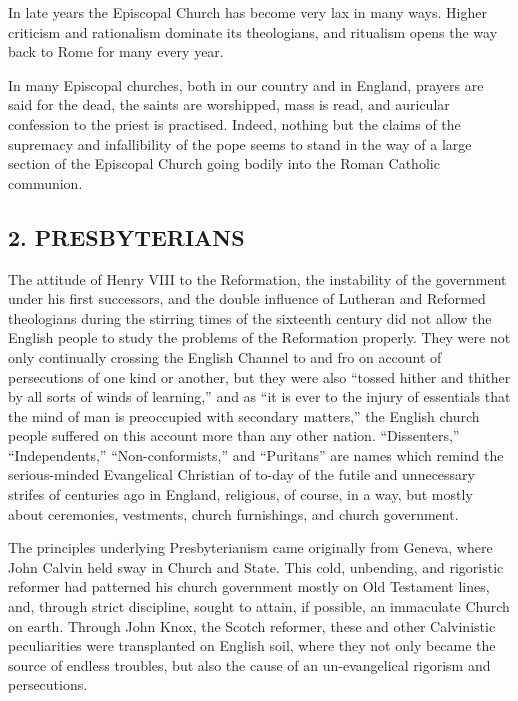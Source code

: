 \documentclass[
]{book}
\begin{document}
In late years the Episcopal Church has become very lax in many ways. Higher criticism and rationalism dominate its theologians, and ritualism opens the way back to Rome for many every year.

In many Episcopal churches, both in our country and in England, prayers are said for the dead, the saints are worshipped, mass is read, and auricular confession to the priest is practised. Indeed, nothing but the claims of the supremacy and infallibility of the pope seems to stand in the way of a large section of the Episcopal Church going bodily into the Roman Catholic communion.

\hypertarget{presbyterians}{%
\subsection*{\texorpdfstring{2. PRESBYTERIANS}{2. PRESBYTERIANS}}\label{presbyterians}}

The attitude of Henry VIII to the Reformation, the instability of the government under his first successors, and the double influence of Lutheran and Reformed theologians during the stirring times of the sixteenth century did not allow the English people to study the problems of the Reformation properly. They were not only continually crossing the English Channel to and fro on account of persecutions of one kind or another, but they were also ``tossed hither and thither by all sorts of winds of learning,'' and as ``it is ever to the injury of essentials that the mind of man is preoccupied with secondary matters,'' the English church people suffered on this account more than any other nation. ``Dissenters,'' ``Independents,'' ``Non-conformists,'' and ``Puritans'' are names which remind the serious-minded Evangelical Christian of to-day of the futile and unnecessary strifes of centuries ago in England, religious, of course, in a way, but mostly about ceremonies, vestments, church furnishings, and church government.

The principles underlying Presbyterianism came originally from Geneva, where John Calvin held sway in Church and State. This cold, unbending, and rigoristic reformer had patterned his church government mostly on Old Testament lines, and, through strict discipline, sought to attain, if possible, an immaculate Church on earth. Through John Knox, the Scotch reformer, these and other Calvinistic peculiarities were transplanted on English soil, where they not only became the source of endless troubles, but also the cause of an un-evangelical rigorism and persecutions.
\end{document}
